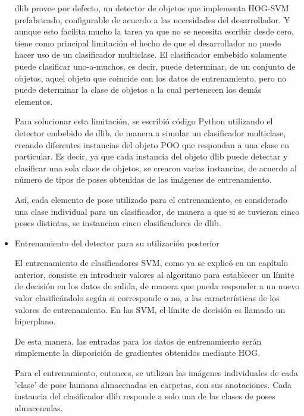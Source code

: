 \documentclass[a4paper,12pt,oneside,spanish]{book}
\begin{document}
\begin{itemize}
	dlib provee por defecto, un detector de objetos que implementa HOG-SVM prefabricado, configurable de acuerdo a las necesidades del desarrollador. Y aunque esto facilita mucho la tarea ya que no se necesita escribir desde cero, tiene como principal limitación el hecho de que el desarrollador no puede hacer uso de un clasificador multiclase. El clasificador embebido solamente puede clasificar uno-a-muchos, es decir, puede determinar, de un conjunto de objetos, aquel objeto que coincide con los datos de entrenamiento, pero no puede determinar la clase de objetos a la cual pertenecen los demás elementos.\par
	
	Para solucionar esta limitación, se escribió código Python utilizando el detector embebido de dlib, de manera a simular un clasificador multiclase, creando diferentes instancias del objeto POO que respondan a una clase en particular. Es decir, ya que cada instancia del objeto dlib puede detectar y clasificar una sola clase de objetos, se crearon varias instancias, de acuerdo al número de tipos de poses obtenidas de las imágenes de entrenamiento.\par
	
	Así, cada elemento de pose utilizado para el entrenamiento, es considerado una clase individual para un clasificador, de manera a que si se tuvieran cinco poses distintas, se instancian cinco clasificadores de dlib.\par
	
		
\item{Entrenamiento del detector para su utilización posterior}\par
	El entrenamiento de clasificadores SVM, como ya se explicó en un capítulo anterior, consiste en introducir valores al algoritmo para establecer un límite de decisión en los datos de salida, de manera que pueda responder a un nuevo valor clasificándolo según si corresponde o no, a las características de los valores de entrenamiento. En las SVM, el límite de decisión es llamado un hiperplano.\par
	
	De esta manera, las entradas para los datos de entrenamiento serán simplemente la disposición de gradientes obtenidos mediante HOG.\par
	
	Para el entrenamiento, entonces, se utilizan las imágenes individuales de cada 'clase' de pose humana almacenadas en carpetas, con sus anotaciones. Cada instancia del clasificador dlib responde a solo una de las clases de poses almacenadas. \par
	

\end{itemize}
\end{document}
